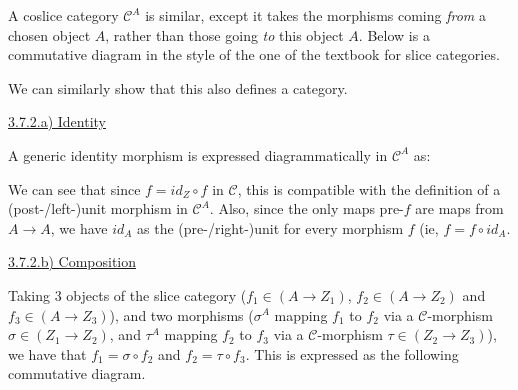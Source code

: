 A coslice category $\mathcal{C}^A$ is similar, except it takes the morphisms coming \textit{from} a chosen object $A$, rather than those going \textit{to} this object $A$. Below is a commutative diagram in the style of the one of the textbook for slice categories.


We can similarly show that this also defines a category.

\vspace{5mm}
\underline{3.7.2.a) Identity}

A generic identity morphism is expressed diagrammatically in $\mathcal{C}^A$ as:


We can see that since $f = id_Z \circ f$ in $\mathcal{C}$, this is compatible with the definition of a (post-/left-)unit morphism in $\mathcal{C}^A$. Also, since the only maps pre-$f$ are maps from $A \to A$, we have $id_A$ as the (pre-/right-)unit for every morphism $f$ (ie, $f = f \circ id_A$. 

\vspace{5mm}
\underline{3.7.2.b) Composition}

Taking 3 objects of the slice category ($f_1 \in (A \to Z_1)$, $f_2 \in (A \to Z_2)$ and $f_3 \in (A \to Z_3)$), and two morphisms ($\sigma^A$ mapping $f_1$ to $f_2$ via a $\mathcal{C}$-morphism $\sigma \in (Z_1 \to Z_2)$, and $\tau^A$ mapping $f_2$ to $f_3$ via a $\mathcal{C}$-morphism $\tau \in (Z_2 \to Z_3)$), we have that $f_1 = \sigma \circ f_2$ and $f_2 = \tau  \circ f_3$. This is expressed as the following commutative diagram.

